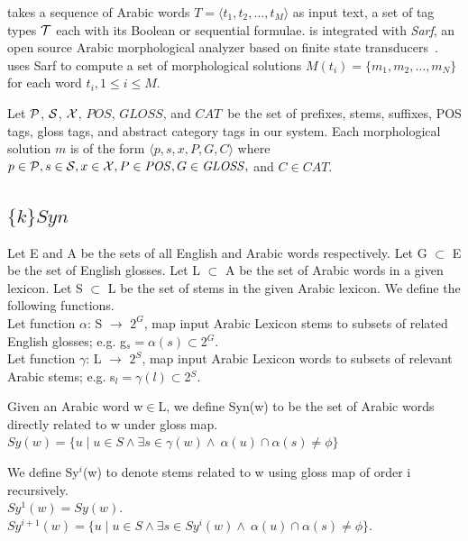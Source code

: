 \framework takes a sequence of Arabic words 
$T=\langle t_1,t_2,\ldots,t_M\rangle$ as input text, 
a set of tag types ${\cal T}$ each with its Boolean or sequential formulae. 
\framework is integrated with {\em Sarf}, 
an open source Arabic morphological analyzer based on finite state transducers~\cite{ZaMaColing2012DemosSarf}. 
\framework uses Sarf to compute a set of morphological solutions $M(t_i)=\{m_1,m_2,\ldots,m_N\}$
for each word $t_i, 1\le i \le M$.

\def\pp{\ensuremath{{\cal P}}} %
\def\ss{\ensuremath{{\cal S}}} %
\def\xx{\ensuremath{{\cal X}}} %
\def\PP{\ensuremath{\mathit{POS}}} %
\def\GG{\ensuremath{\mathit{GLOSS}}} %
\def\AC{\ensuremath{\mathit{CAT}}} %


Let \pp, \ss, \xx, \PP, \GG, and \AC~be the set of 
prefixes, stems, suffixes, POS tags, gloss tags, and abstract category tags
in our system.
Each morphological solution $m$ is of the form $\langle p,s,x,P,G,C\rangle$ 
where $p\in \pp, s\in \ss, x\in \xx, P \in \PP, G \in \GG,$ and $C \in \AC$. 

\subsection{$\{k\}Syn$}
Let E and A be the sets of all English and Arabic words respectively. 
Let G $\subset$ E be the set of English glosses. 
Let L $\subset$ A be the set of Arabic words in a given lexicon. 
Let S $\subset$ L be the set of stems in the given Arabic lexicon.
We define the following functions.\\
Let function $\alpha$: S $\rightarrow$ $2^G$, map input Arabic Lexicon stems to subsets of related English glosses; e.g. g$_{s} = \alpha(s)\subset$2$^{G}$.\\
Let function $\gamma$: L $\rightarrow$ $2^S$, map input Arabic Lexicon words to subsets of relevant Arabic stems; e.g. s$_{l} = \gamma(l)\subset$2$^{S}$.

Given an Arabic word w$\in$L, we define Syn(w) to be the set of Arabic words directly related to w under gloss map.\\
$Sy(w)=\{u\mid u\in S\land\exists s\in \gamma(w)\land~\alpha(u)\cap\alpha(s)\neq\phi\}$

We define Sy$^{i}$(w) to denote stems related to w using gloss map of order i recursively.\\
$Sy^{1}(w) = Sy(w)$.\\
$Sy^{i+1}(w)=\{u\mid u\in S\land\exists s\in Sy^{i}(w)\land~\alpha(u)\cap\alpha(s)\neq\phi\}$.

